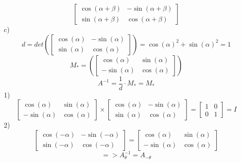 \documentclass[11pt]{article}
\begin{document}
    \[ \begin{bmatrix}
                        \cos(\alpha+\beta) & -\sin(\alpha+\beta)\\
                        \sin(\alpha+\beta) & \cos(\alpha+\beta)
    \end{bmatrix} \]
    c)
    \[ d=det(\begin{bmatrix}
                \cos(\alpha) & -\sin(\alpha)\\
                \sin(\alpha) & \cos(\alpha)
    \end{bmatrix}) = \cos(\alpha)^2+\sin(\alpha)^2=1 \]
    \[ M_*=(\begin{bmatrix}
               \cos(\alpha)  & \sin(\alpha)\\
               -\sin(\alpha) & \cos(\alpha)
    \end{bmatrix}) \]
    \[ A^{-1}=\frac{1}{d}\cdot M_*=M_* \]
    1)
    \[ \begin{bmatrix}
                     \cos(\alpha)  & \sin(\alpha)\\
                     -\sin(\alpha) & \cos(\alpha)
    \end{bmatrix} \times \begin{bmatrix}
                             \cos(\alpha)  & -\sin(\alpha)\\
                             \sin(\alpha) & \cos(\alpha)
    \end{bmatrix} = \begin{bmatrix}
                        1 & 0\\
                        0 & 1
    \end{bmatrix} = I \]
    2)
    \[ \begin{bmatrix}
                     \cos(-\alpha)  & -\sin(-\alpha)\\
                     \sin(-\alpha)  &  \cos(-\alpha)
    \end{bmatrix} = \begin{bmatrix}
                        \cos(\alpha)  & \sin(\alpha)\\
                        -\sin(\alpha) & \cos(\alpha)
    \end{bmatrix} \]
    \[ => A_\theta^{-1}=A_{-\theta} \]
\end{document}
